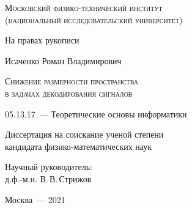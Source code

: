 \thispagestyle{empty}


\begin{titlepage}
	\begin{center}
		\textsc{Московский физико-технический институт \\ (национальный исследовательский университет)}\\
	\end{center}
	\vspace{1.5cm}
	\begin{flushright}
		{На правах рукописи}
	\end{flushright}
	\vspace{2cm}
	\begin{center}
		{Исаченко Роман Владимирович}
		\par
		\vspace{2cm}
		\textsc{Снижение размерности пространства \\ в задачах декодирования сигналов}
		\par
		\vspace{2cm}
		{05.13.17~--- Теоретические основы информатики}
		\par
		\vspace{2cm}
		{Диссертация на соискание ученой степени\\
			кандидата физико-математических наук}
	\end{center}
	\vspace{2cm}
	\hfill\parbox{8,4cm}{Научный руководитель:
		\\д.ф.-м.н. В.\,В.\,Стрижов}
	\par
	\vspace{3.5cm}
	\begin{center}
		{Москва~--- 2021}
	\end{center}
\end{titlepage}